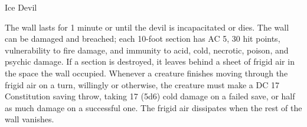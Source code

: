 \begin{monsterbox}{Ice Devil}
\begin{monsteraction}
The wall lasts for 1 minute or until the devil is incapacitated or dies. The wall can be damaged and breached; each 10-foot section has AC 5, 30 hit points, vulnerability to fire damage, and immunity to acid, cold, necrotic, poison, and psychic damage. If a section is destroyed, it leaves behind a sheet of frigid air in the space the wall occupied. Whenever a creature finishes moving through the frigid air on a turn, willingly or otherwise, the creature must make a DC 17 Constitution saving throw, taking 17 (5d6) cold damage on a failed save, or half as much damage on a successful one. The frigid air dissipates when the rest of the wall vanishes.
\end{monsteraction}
\end{monsterbox}
